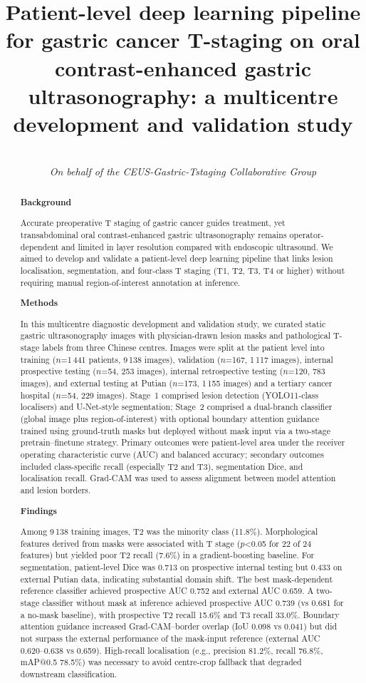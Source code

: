 \documentclass[11pt,a4paper]{article}
\title{%
  \textbf{Patient-level deep learning pipeline for gastric cancer T-staging on oral contrast-enhanced gastric ultrasonography: a multicentre development and validation study}%
}
\author{%
  \todo{Author list, affiliations, corresponding author email, ORCID}\\
  \textit{On behalf of the CEUS-Gastric-Tstaging Collaborative Group}%
}
\date{}
\begin{document}
\maketitle

\begin{abstract}
\noindent\textbf{Background}\par
Accurate preoperative T staging of gastric cancer guides treatment, yet transabdominal oral contrast-enhanced gastric ultrasonography remains operator-dependent and limited in layer resolution compared with endoscopic ultrasound. We aimed to develop and validate a patient-level deep learning pipeline that links lesion localisation, segmentation, and four-class T staging (T1, T2, T3, T4 or higher) without requiring manual region-of-interest annotation at inference.

\noindent\textbf{Methods}\par
In this multicentre diagnostic development and validation study, we curated static gastric ultrasonography images with physician-drawn lesion masks and pathological T-stage labels from three Chinese centres. Images were split at the patient level into training ($n$=1\,441 patients, 9\,138 images), validation ($n$=167, 1\,117 images), internal prospective testing ($n$=54, 253 images), internal retrospective testing ($n$=120, 783 images), and external testing at Putian ($n$=173, 1\,155 images) and a tertiary cancer hospital ($n$=54, 229 images). Stage~1 comprised lesion detection (YOLO11-class localisers) and U-Net-style segmentation; Stage~2 comprised a dual-branch classifier (global image plus region-of-interest) with optional boundary attention guidance trained using ground-truth masks but deployed without mask input via a two-stage pretrain--finetune strategy. Primary outcomes were patient-level area under the receiver operating characteristic curve (AUC) and balanced accuracy; secondary outcomes included class-specific recall (especially T2 and T3), segmentation Dice, and localisation recall. Grad-CAM was used to assess alignment between model attention and lesion borders.

\noindent\textbf{Findings}\par
Among 9\,138 training images, T2 was the minority class (11.8\%). Morphological features derived from masks were associated with T stage ($p$<0.05 for 22 of 24 features) but yielded poor T2 recall (7.6\%) in a gradient-boosting baseline. For segmentation, patient-level Dice was 0.713 on prospective internal testing but 0.433 on external Putian data, indicating substantial domain shift. The best mask-dependent reference classifier achieved prospective AUC 0.752 and external AUC 0.659. A two-stage classifier without mask at inference achieved prospective AUC 0.739 (vs 0.681 for a no-mask baseline), with prospective T2 recall 15.6\% and T3 recall 33.0\%. Boundary attention guidance increased Grad-CAM--border overlap (IoU 0.098 vs 0.041) but did not surpass the external performance of the mask-input reference (external AUC 0.620--0.638 vs 0.659). High-recall localisation (e.g., precision 81.2\%, recall 76.8\%, mAP@0.5 78.5\%) was necessary to avoid centre-crop fallback that degraded downstream classification.


\end{abstract}
\end{document}
